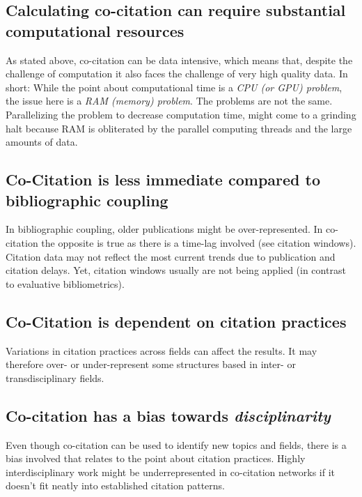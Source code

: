\documentclass[
  letterpaper,
]{scrreprt}
\begin{document}
\subsection{Calculating co-citation can require substantial
computational
resources}\label{calculating-co-citation-can-require-substantial-computational-resources}

As stated above, co-citation can be data intensive, which means that,
despite the challenge of computation it also faces the challenge of very
high quality data. In short: While the point about computational time is
a \emph{CPU (or GPU) problem}, the issue here is a \emph{RAM (memory)
problem}. The problems are not the same. Parallelizing the problem to
decrease computation time, might come to a grinding halt because RAM is
obliterated by the parallel computing threads and the large amounts of
data.

\subsection{Co-Citation is less immediate compared to bibliographic
coupling}\label{co-citation-is-less-immediate-compared-to-bibliographic-coupling}

In bibliographic coupling, older publications might be over-represented.
In co-citation the opposite is true as there is a time-lag involved (see
citation windows). Citation data may not reflect the most current trends
due to publication and citation delays. Yet, citation windows usually
are not being applied (in contrast to evaluative bibliometrics).

\subsection{Co-Citation is dependent on citation
practices}\label{co-citation-is-dependent-on-citation-practices}

Variations in citation practices across fields can affect the results.
It may therefore over- or under-represent some structures based in
inter- or transdisciplinary fields.

\subsection{\texorpdfstring{Co-citation has a bias towards
\emph{disciplinarity}}{Co-citation has a bias towards disciplinarity}}\label{co-citation-has-a-bias-towards-disciplinarity}

Even though co-citation can be used to identify new topics and fields,
there is a bias involved that relates to the point about citation
practices. Highly interdisciplinary work might be underrepresented in
co-citation networks if it doesn't fit neatly into established citation
patterns.
\end{document}
